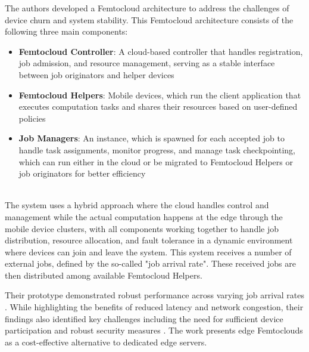 The authors developed a Femtocloud architecture to address the challenges of device churn and system stability. This Femtocloud architecture consists of the following three main components: 
\begin{itemize}
  \item \textbf{Femtocloud Controller}: A cloud-based controller that handles registration, job admission, and resource management, serving as a stable interface between job originators and helper devices
  \item \textbf{Femtocloud Helpers}: Mobile devices, which run the client application that executes computation tasks and shares their resources based on user-defined policies
  \item \textbf{Job Managers}: An instance, which is spawned for each accepted job to handle task assignments, monitor progress, and manage task checkpointing, which can run either in the cloud or be migrated to Femtocloud Helpers or job originators for better efficiency
\end{itemize}
~\\
The system uses a hybrid approach where the cloud handles control and management while the actual computation happens at the edge through the mobile device clusters, with all components working together to handle job distribution, resource allocation, and fault tolerance in a dynamic environment where devices can join and leave the system. This system receives a number of external jobs, defined by the so-called "job arrival rate". These received jobs are then distributed among available Femtocloud Helpers.

Their prototype demonstrated robust performance across varying job arrival rates \cite{relatedwork:mobilecloud}. While highlighting the benefits of reduced latency and network congestion, their findings also identified key challenges including the need for sufficient device participation and robust security measures \cite{relatedwork:mobilecloud}. The work presents edge Femtoclouds as a cost-effective alternative to dedicated edge servers. 

